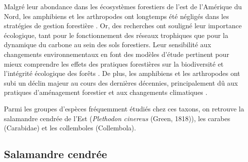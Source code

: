 
Malgré leur abondance dans les écosystèmes forestiers de l'est de l'Amérique du Nord, les amphibiens et les arthropodes ont longtemps été négligés dans les stratégies de gestion forestière \citep{deMaynadier1995relationshipforest}. 
Or, des recherches ont souligné leur importance écologique, tant pour le fonctionnement des réseaux trophiques que pour la dynamique du carbone au sein des sols forestiers. 
Leur sensibilité aux changements environnementaux en font des modèles d’étude pertinent pour mieux comprendre les effets des pratiques forestières sur la biodiversité et l'intégrité écologique des forêts \citep{pongeVerticalDistributionCollembola2000,birdChangesSoilLitter2004,Maleque2009Arthropodsbioindicators}.
De plus, les amphibiens et les arthropodes ont subi un déclin majeur au cours des dernières décennies, principalement dû aux pratiques d'aménagement forestier et aux changements climatiques \citep{Houlahan2000Quantitativeevidence,Stuart2004Statustrends,Warren2018projectedeffect,Wagner2021Insectdecline}. 

Parmi les groupes d'espèces fréquemment étudiés chez ces taxons, on retrouve la salamandre cendrée de l'Est (\textit{Plethodon cinereus} (Green, 1818)), les carabes (Carabidae) et les collemboles (Collembola).


\subsection*{Salamandre cendrée}

